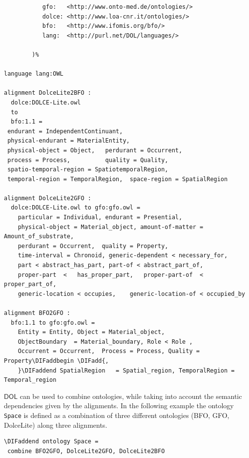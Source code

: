 \documentclass[10pt,fleqn,final]{scrreprt}
\newcommand*{\DOL}{\ensuremath{\mathsf{DOL}}\xspace}
\newenvironment{definitions}[0]{\medskip }{}
\providecommand{\DIFadd}[1]{{\protect\color{blue}\uwave{#1}}} %
\providecommand{\DIFaddbegin}{} %
\providecommand{\DIFaddend}{} %
\providecommand{\DIFdelbegin}{} %
\providecommand{\DIFdelend}{} %
\begin{document}
\begin{definitions}
\DIFdelbegin %
\DIFdelend \DIFaddbegin \begin{lstlisting}[basicstyle=\ttfamily\footnotesize,language=dolText,escapechar=@,mathescape]
\DIFaddend %prefix(
           gfo:   <http://www.onto-med.de/ontologies/>
           dolce: <http://www.loa-cnr.it/ontologies/>
           bfo:   <http://www.ifomis.org/bfo/>
           lang:  <http://purl.net/DOL/languages/>

        )%

language lang:OWL

alignment DolceLite2BFO :
  dolce:DOLCE-Lite.owl
  to
  bfo:1.1 =
 endurant = IndependentContinuant,
 physical-endurant = MaterialEntity,
 physical-object = Object,   perdurant = Occurrent,
 process = Process,          quality = Quality,
 spatio-temporal-region = SpatiotemporalRegion,
 temporal-region = TemporalRegion,  space-region = SpatialRegion

alignment DolceLite2GFO :
  dolce:DOLCE-Lite.owl to gfo:gfo.owl =
 	particular = Individual, endurant = Presential,
 	physical-object = Material_object, amount-of-matter = Amount_of_substrate,
 	perdurant = Occurrent, 	quality = Property,
 	time-interval = Chronoid, generic-dependent < necessary_for,
 	part < abstract_has_part, part-of < abstract_part_of,
 	proper-part  <	 has_proper_part,  	proper-part-of  < proper_part_of,
 	generic-location < occupies, 	generic-location-of < occupied_by

alignment BFO2GFO :
  bfo:1.1 to gfo:gfo.owl =
	Entity = Entity, Object = Material_object,
	ObjectBoundary  = Material_boundary, Role < Role ,
 	Occurrent = Occurrent, 	Process = Process, Quality = Property\DIFaddbegin \DIFadd{,
 	}\DIFaddend SpatialRegion 	= Spatial_region, TemporalRegion = Temporal_region 	
\end{lstlisting}


 \DOL can be used to combine ontologies, while taking into account the semantic dependencies given by the alignments. In the following example the ontology \lstinline{Space} is defined as a combination of three different ontologies (BFO, GFO, DolceLite) along three alignments. 

\DIFdelbegin %
\DIFdelend \DIFaddbegin \begin{lstlisting}[basicstyle=\ttfamily\footnotesize,language=dolText,escapechar=@,mathescape]
\DIFaddend ontology Space =
 combine BFO2GFO, DolceLite2GFO, DolceLite2BFO
\end{lstlisting} 


\end{definitions}
\end{document}
